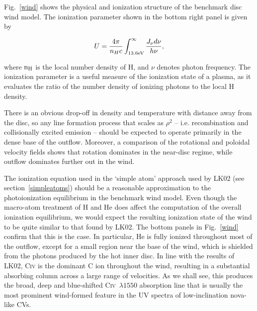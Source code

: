Fig.~\ref{wind} shows the physical and ionization structure 
of the benchmark disc wind model. The ionization parameter shown in the bottom
right panel is given by

\begin{equation}
U = \frac{4\pi}{n_H c}\int_{13.6{\rm{eV}}}^{\infty}\frac{{J_{\nu}d\nu}}{h\nu},
\end{equation}
 
\noindent where $\rm{n_H}$ is the local number density of H, and $\nu$ denotes photon 
frequency. The ionization parameter is a useful measure of the ionization state of a plasma, 
as it evaluates the ratio of the number density of ionizing photons to the local 
H density.


There is an obvious drop-off in density
and temperature with distance away from the disc, so any line
formation process that scales as $\rho^2$ -- i.e. recombination and
collisionally excited emission -- should be expected to operate
primarily in the dense base of the outflow. Moreover, a comparison of
the rotational and poloidal velocity fields shows that rotation
dominates in the near-disc regime, while outflow dominates further out
in the wind. 

The ionization equation used in the `simple atom' approach used by
LK02 (see section~\ref{simpleatoms}) should be a reasonable approximation to
the photoionization equilibrium in the benchmark wind model. Even
though the macro-atom treatment of H and He does affect the 
computation of the overall ionization equilibrium, we would expect the
resulting ionization state of the wind to be quite similar to that
found by LK02. The bottom panels in Fig.~\ref{wind} confirm that this
is the case. In particular, He is fully ionized
throughout most of the outflow, except for a small region near the
base of the wind, which is shielded from the photons produced by the
hot inner disc. In line with the results of LK02,
C\textsc{iv} is the dominant C ion throughout the wind,
resulting in a substantial absorbing column across a large range of
velocities. As we shall see, this produces the broad, deep and
blue-shifted C\textsc{iv}~$\lambda1550$ absorption line that
is usually the most prominent wind-formed feature in the UV spectra of
low-inclination nova-like CVs.

